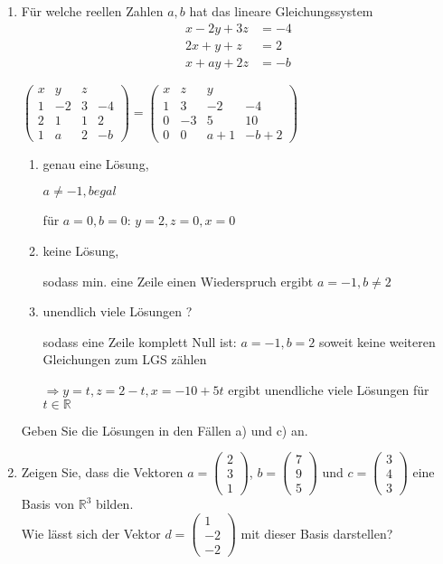 \documentclass[12pt,a4paper]{scrreprt}
\newcommand{\R}{\mathds{R}}
\newcommand{\Lsg}{\textbf{Lsg.:}}
\begin{document}
\begin{enumerate}
	\item Für welche reellen Zahlen $a,b$ hat das lineare Gleichungssystem	\begin{align*}
					 x-2y+3z &= -4 \\
					2x +y +z &=  2 \\
					x + ay + 2z &= -b			
		 \end{align*}

$
\begin{pmatrix}
x	&	y	&	z	&		\\
1	&	-2	&	3	&	-4	\\
2	&	1	&	1	&	2	\\
1	&	a	&	2	&	-b
\end{pmatrix}
=\begin{pmatrix}
x	&	z	&	y	&		\\
1	&	3	&	-2	&	-4	\\
0	&	-3	&	5	&	10	\\
0	&	0	&	a+1	&	-b+2
\end{pmatrix}
$

	\begin{enumerate}
		\item genau eine Lösung,

		$a\neq -1, b egal$
		
		für $a=0, b=0$: $y=2, z=0, x=0$
		
		\item keine Lösung,
		
		sodass min. eine Zeile einen Wiederspruch ergibt
		$a=-1, b\neq 2$
		
		\item unendlich viele Lösungen ?
		
		sodass eine Zeile komplett Null ist: 
		$a=-1, b=2 $ soweit keine weiteren Gleichungen zum LGS zählen
		
		$\Rightarrow  y=t, z=2-t, x=-10+5t$ ergibt unendliche viele Lösungen für $t \in \R$
	\end{enumerate}
Geben Sie die Lösungen in den Fällen a) und c) an.
	
	\item
Zeigen Sie, dass die Vektoren $a=\begin{pmatrix} 2 \\ 3 \\ 1 \end{pmatrix}$,  $b=\begin{pmatrix} 7 \\ 9 \\ 5 \end{pmatrix}$ und $c=\begin{pmatrix} 3 \\ 4 \\ 3 \end{pmatrix}$ eine Basis von $\R^3$ bilden. \\
 Wie lässt sich der Vektor $d=\begin{pmatrix} 1 \\ -2 \\ -2 \end{pmatrix}$ mit dieser Basis darstellen? 


\end{enumerate}
\end{document}

